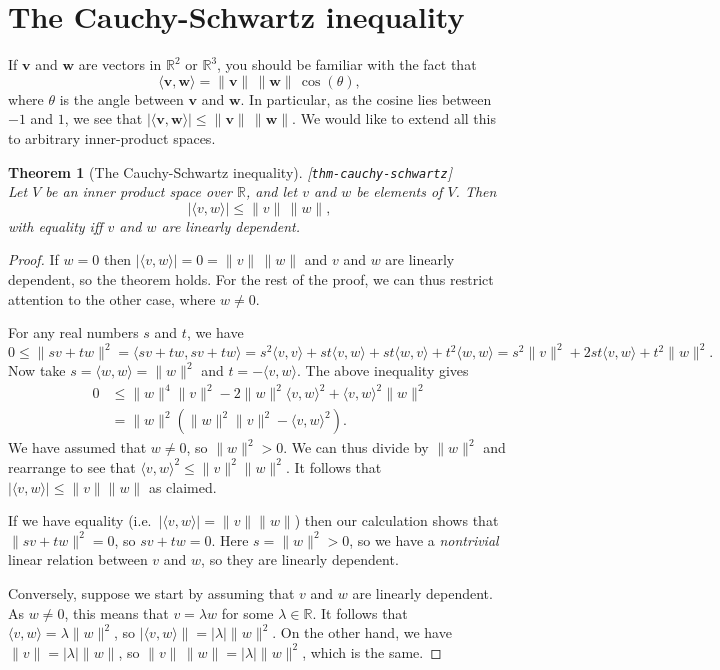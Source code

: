 \documentclass{amsart}
\newcommand{\lbl}[1]{\label{#1}\textup{[\texttt{#1}]}\ \\}
\newcommand{\lbl}{\label}
\newcommand{\R}         {{\mathbb{R}}}
\newcommand{\lm}        {\lambda}
\newcommand{\tht}       {\theta}
\newcommand{\ip}[1]     {\langle #1\rangle}
\newcommand{\vv}        {\mathbf{v}}
\newcommand{\vw}        {\mathbf{w}}
\renewcommand{\:}       {\colon}
\newtheorem{theorem}{Theorem}[section]
\theoremstyle{definition}
\begin{document}
\section{The Cauchy-Schwartz inequality}
\label{sec-cauchy}

If $\vv$ and $\vw$ are vectors in $\R^2$ or $\R^3$, you
should be familiar with the fact that 
\[ \ip{\vv,\vw} = \|\vv\|\,\|\vw\|\,\cos(\tht), \]
where $\tht$ is the angle between $\vv$ and $\vw$.  In
particular, as the cosine lies between $-1$ and $1$, we see
that $|\ip{\vv,\vw}|\leq\|\vv\|\,\|\vw\|$.  We would like to
extend all this to arbitrary inner-product spaces.

\begin{theorem}[The Cauchy-Schwartz inequality]\lbl{thm-cauchy-schwartz}
 Let $V$ be an inner product space over $\R$, and let $v$
 and $w$ be elements of $V$.  Then
 \[ |\ip{v,w}| \leq \|v\|\,\|w\|, \]
 with equality iff $v$ and $w$ are linearly dependent.
\end{theorem}
\begin{proof}
 If $w=0$ then $|\ip{v,w}|=0=\|v\|\,\|w\|$ and $v$ and $w$
 are linearly dependent, so the theorem holds.  For the
 rest of the proof, we can thus restrict attention to the
 other case, where $w\neq 0$.

 For any real numbers $s$ and $t$, we have 
 \[ 0 \leq \|sv+tw\|^2 = \ip{sv+tw,sv+tw} = 
      s^2\ip{v,v} + st\ip{v,w} + st\ip{w,v} + t^2\ip{w,w} = 
      s^2\|v\|^2 + 2st\ip{v,w} + t^2\|w\|^2.
 \]
 Now take $s=\ip{w,w}=\|w\|^2$ and $t=-\ip{v,w}$.  The above
 inequality gives 
 \begin{align*}
  0 &\leq 
    \|w\|^4 \|v\|^2 - 2\|w\|^2\ip{v,w}^2 + \ip{v,w}^2\|w\|^2 \\
    &= \|w\|^2(\|w\|^2\|v\|^2-\ip{v,w}^2).
 \end{align*}
 We have assumed that $w\neq 0$, so $\|w\|^2>0$.  We can
 thus divide by $\|w\|^2$ and rearrange to see that
 $\ip{v,w}^2\leq\|v\|^2\|w\|^2$.  It follows that
 $|\ip{v,w}|\leq\|v\|\|w\|$ as claimed. 

 If we have equality (i.e.~$|\ip{v,w}|=\|v\|\|w\|$) then our
 calculation shows that $\|sv+tw\|^2=0$, so $sv+tw=0$.  Here
 $s=\|w\|^2>0$, so we have a \emph{nontrivial} linear
 relation between $v$ and $w$, so they are linearly
 dependent. 

 Conversely, suppose we start by assuming that $v$ and $w$
 are linearly dependent.  As $w\neq 0$, this means that
 $v=\lm w$ for some $\lm\in\R$.  It follows that
 $\ip{v,w}=\lm\|w\|^2$, so $|\ip{v,w}\|=|\lm|\|w\|^2$.  On
 the other hand, we have $\|v\|=|\lm|\|w\|$, so
 $\|v\|\,\|w\|=|\lm|\|w\|^2$, which is the same.
\end{proof}
\end{document}
